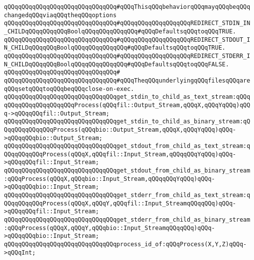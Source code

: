 \verb|qQQqqQQqqQQqqQQqqQQqqQQqqQQqqQQq#qQQqThisqQQqbehaviorqQQqmayqQQqbeqQQqchangedqQQqviaqQQqtheqQQqoptions|\newline
\verb|qQQqqQQqqQQqqQQqqQQqqQQqqQQqqQQq#qQQqqQQqqQQqqQQqqQQqREDIRECT_STDIN_IN_CHILDqQQqqQQqqQQqBoolqQQqqQQqqQQqqQQq#qQQqDefaultsqQQqtoqQQqTRUE.|\newline
\verb|qQQqqQQqqQQqqQQqqQQqqQQqqQQqqQQq#qQQqqQQqqQQqqQQqqQQqREDIRECT_STDOUT_IN_CHILDqQQqqQQqBoolqQQqqQQqqQQqqQQq#qQQqDefaultsqQQqtoqQQqTRUE.|\newline
\verb|qQQqqQQqqQQqqQQqqQQqqQQqqQQqqQQq#qQQqqQQqqQQqqQQqqQQqREDIRECT_STDERR_IN_CHILDqQQqqQQqBoolqQQqqQQqqQQqqQQq#qQQqDefaultsqQQqtoqQQqFALSE.|\newline
\verb|qQQqqQQqqQQqqQQqqQQqqQQqqQQqqQQq#|\newline
\verb|qQQqqQQqqQQqqQQqqQQqqQQqqQQqqQQq#qQQqTheqQQqunderlyingqQQqfilesqQQqareqQQqsetqQQqtoqQQqbeqQQqclose-on-exec.|\newline
\newline
\verb|qQQqqQQqqQQqqQQqqQQqqQQqqQQqqQQqget_stdin_to_child_as_text_stream:qQQqqQQqqQQqqQQqqQQqqQQqProcess(qQQqfil::Output_Stream,qQQqX,qQQqYqQQq)qQQq->qQQqqQQqfil::Output_Stream;|\newline
\verb|qQQqqQQqqQQqqQQqqQQqqQQqqQQqqQQqget_stdin_to_child_as_binary_stream:qQQqqQQqqQQqqQQqProcess(qQQqbio::Output_Stream,qQQqX,qQQqYqQQq)qQQq->qQQqqQQqbio::Output_Stream;|\newline
\newline
\verb|qQQqqQQqqQQqqQQqqQQqqQQqqQQqqQQqget_stdout_from_child_as_text_stream:qQQqqQQqqQQqProcess(qQQqX,qQQqfil::Input_Stream,qQQqqQQqYqQQq)qQQq->qQQqqQQqfil::Input_Stream;|\newline
\verb|qQQqqQQqqQQqqQQqqQQqqQQqqQQqqQQqget_stdout_from_child_as_binary_stream:qQQqProcess(qQQqX,qQQqbio::Input_Stream,qQQqqQQqYqQQq)qQQq->qQQqqQQqbio::Input_Stream;|\newline
\newline
\verb|qQQqqQQqqQQqqQQqqQQqqQQqqQQqqQQqget_stderr_from_child_as_text_stream:qQQqqQQqqQQqProcess(qQQqX,qQQqY,qQQqfil::Input_StreamqQQqqQQq)qQQq->qQQqqQQqfil::Input_Stream;|\newline
\verb|qQQqqQQqqQQqqQQqqQQqqQQqqQQqqQQqget_stderr_from_child_as_binary_stream:qQQqProcess(qQQqX,qQQqY,qQQqbio::Input_StreamqQQqqQQq)qQQq->qQQqqQQqbio::Input_Stream;|\newline
\newline
\verb|qQQqqQQqqQQqqQQqqQQqqQQqqQQqqQQqprocess_id_of:qQQqProcess(X,Y,Z)qQQq->qQQqInt;|\newline
